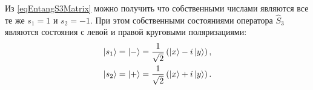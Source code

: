 
Из \eqref{eqEntangS3Matrix} можно получить что собственными числами
являются все те же $s_1 = 1$ и $s_2 = -1$. При этом собственными
состояниями оператора $\hat{S}_3$ являются состояния с левой и правой
круговыми поляризациями:
\begin{eqnarray}
  \ket{ s_1 } = \ket{ - } = \frac{1}{\sqrt{2}}
  \left(
  \ket{x} - i \ket{y}
  \right),
  \nonumber \\
  \ket{ s_2 } = \ket{ + } = \frac{1}{\sqrt{2}}
  \left(
  \ket{x} + i \ket{y}
  \right).
  \label{eqEntangS3Eigenvec}
\end{eqnarray}






